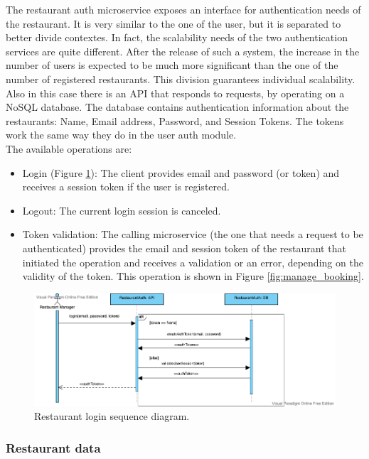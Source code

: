 The restaurant auth microservice exposes an interface for authentication needs of the
restaurant. It is very similar to the one of the user, but it is separated to better
divide contextes. In fact, the scalability needs of the two authentication services are
quite different. After the release of such a system, the increase in the number of users
is expected to be much more significant than the one of the number of registered
restaurants. This division guarantees individual scalability.
Also in this case there is an API that responds to requests, by operating on a
NoSQL database. The database contains authentication information about the restaurants:
Name, Email address, Password, and Session Tokens. The tokens work the same way they
do in the user auth module.\\
The available operations are:
\begin{itemize}
    \item Login (Figure \ref{fig:restaurant_login}): The client provides email and
    password (or token) and receives a session token if the user is registered.
    \item Logout: The current login session is canceled.
    \item Token validation: The calling microservice (the one that needs a request to
    be authenticated) provides the email and session token of the restaurant that initiated
    the operation and receives a validation or an error, depending on the validity of
    the token. This operation is shown in Figure \ref{fig:manage_booking}.
\end{itemize}

\begin{figure}[h]
    \includegraphics[width=\linewidth]{../docs/sequence/restaurantAuth/restaurantAuth.png}
    \caption{Restaurant login sequence diagram.}
    \label{fig:restaurant_login}
\end{figure}

\subsubsection{Restaurant data}

